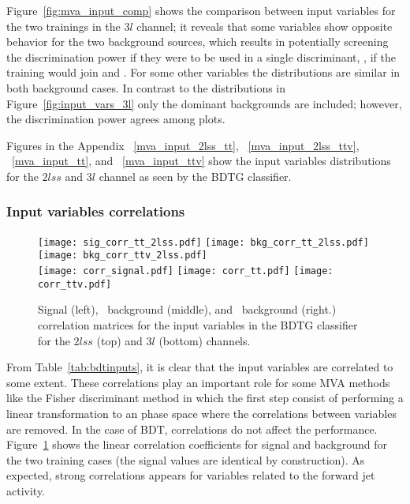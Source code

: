 Figure~\ref{fig:mva_input_comp} shows the comparison between input variables for the two trainings in the $3l$ channel; it reveals that some variables show opposite behavior for the two background sources, which results in potentially screening the discrimination power if they were to be used in a single discriminant, \ie, if the training would join \ttbar and \ttV. For some other variables the distributions are similar in both background cases. In contrast to the distributions in Figure~\ref{fig:input_vars_3l} only the dominant backgrounds are included; however, the discrimination power agrees among plots.

Figures in the Appendix ~\ref{mva_input_2lss_tt}, ~\ref{mva_input_2lss_ttv}, ~\ref{mva_input_tt}, and ~\ref{mva_input_ttv} show the input variables distributions for the $2lss$ and $3l$ channel as seen by the BDTG classifier. 

\subsubsection*{Input variables correlations}

\begin{figure} [!ht]
  \centering
      \texttt{[image: sig\_corr\_tt\_2lss.pdf]}
      \texttt{[image: bkg\_corr\_tt\_2lss.pdf]}
      \texttt{[image: bkg\_corr\_ttv\_2lss.pdf]}\\
      \texttt{[image: corr\_signal.pdf]}
      \texttt{[image: corr\_tt.pdf]}
      \texttt{[image: corr\_ttv.pdf]}
\caption[Correlation matrices for the BDT input variables.]{ Signal (left), \ttbar\ background (middle), and \ttV\ background (right.) correlation matrices for the input variables in the BDTG classifier for the $2lss$ (top) and  $3l$ (bottom) channels.}
\label{mva_corr}
\end{figure}

From Table~\ref{tab:bdtinputs}, it is clear that the input variables are correlated to some extent. These correlations play an important role for some MVA methods like the Fisher discriminant method in which the first step consist of performing a linear transformation to an phase space where the correlations between variables are removed. In the case of BDT, correlations do not affect the performance. Figure~\ref{mva_corr} shows the linear correlation coefficients for signal and background for the two training cases (the signal values are identical by construction). As expected, strong correlations appears for variables related to the forward jet activity.

